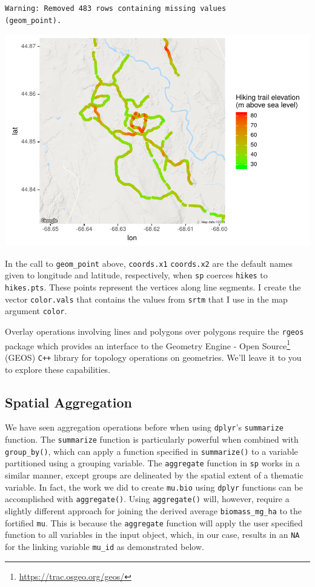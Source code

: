 \documentclass[
]{krantz}
\renewcommand{\href}[2]{#2\footnote{\url{#1}}}
\begin{document}
\begin{verbatim}
Warning: Removed 483 rows containing missing values
(geom_point).
\end{verbatim}

\includegraphics{bookdown_files/figure-latex/unnamed-chunk-220-1.pdf}

In the call to \texttt{geom\_point} above, \texttt{coords.x1} \texttt{coords.x2} are the default names given to longitude and latitude, respectively, when \texttt{sp} coerces \texttt{hikes} to \texttt{hikes.pts}. These points represent the vertices along line segments. I create the vector \texttt{color.vals} that contains the values from \texttt{srtm} that I use in the map argument \texttt{color}.

Overlay operations involving lines and polygons over polygons require the \texttt{rgeos} package which provides an interface to the \href{https://trac.osgeo.org/geos/}{Geometry Engine - Open Source} (GEOS) \texttt{C++} library for topology operations on geometries. We'll leave it to you to explore these capabilities.

\hypertarget{spatial-aggregation}{%
\subsection{Spatial Aggregation}\label{spatial-aggregation}}

We have seen aggregation operations before when using \texttt{dplyr}'s \texttt{summarize} function. The \texttt{summarize} function is particularly powerful when combined with \texttt{group\_by()}, which can apply a function specified in \texttt{summarize()} to a variable partitioned using a grouping variable. The \texttt{aggregate} function in \texttt{sp} works in a similar manner, except groups are delineated by the spatial extent of a thematic variable. In fact, the work we did to create \texttt{mu.bio} using \texttt{dplyr} functions can be accomplished with \texttt{aggregate()}. Using \texttt{aggregate()} will, however, require a slightly different approach for joining the derived average \texttt{biomass\_mg\_ha} to the fortified \texttt{mu}. This is because the \texttt{aggregate} function will apply the user specified function to all variables in the input object, which, in our case, results in an \texttt{NA} for the linking variable \texttt{mu\_id} as demonstrated below.
\end{document}
